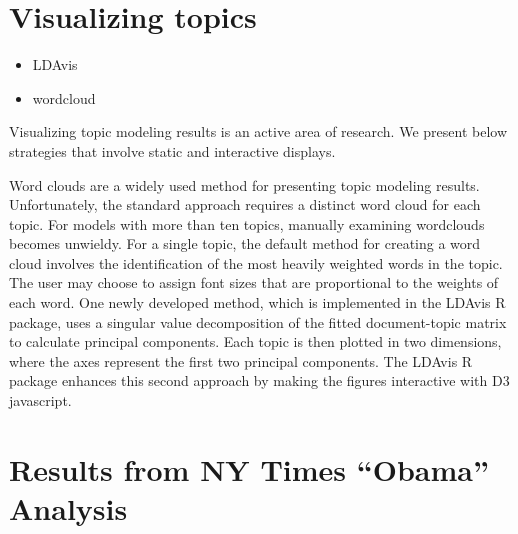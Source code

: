 \documentclass[12pt,]{article}
\providecommand{\tightlist}{%
  \setlength{\itemsep}{0pt}\setlength{\parskip}{0pt}}
\begin{document}
\section{Visualizing topics}\label{visualizing-topics}

\begin{itemize}
\tightlist
\item
  LDAvis
\item
  wordcloud
\end{itemize}

Visualizing topic modeling results is an active area of research. We
present below strategies that involve static and interactive displays.

Word clouds are a widely used method for presenting topic modeling
results. Unfortunately, the standard approach requires a distinct word
cloud for each topic. For models with more than ten topics, manually
examining wordclouds becomes unwieldy. For a single topic, the default
method for creating a word cloud involves the identification of the most
heavily weighted words in the topic. The user may choose to assign font
sizes that are proportional to the weights of each word. One newly
developed method, which is implemented in the LDAvis R package, uses a
singular value decomposition of the fitted document-topic matrix to
calculate principal components. Each topic is then plotted in two
dimensions, where the axes represent the first two principal components.
The LDAvis R package enhances this second approach by making the figures
interactive with D3 javascript.

\section{\texorpdfstring{Results from NY Times ``Obama''
Analysis}{Results from NY Times Obama Analysis}}\label{results-from-ny-times-obama-analysis}
\end{document}
